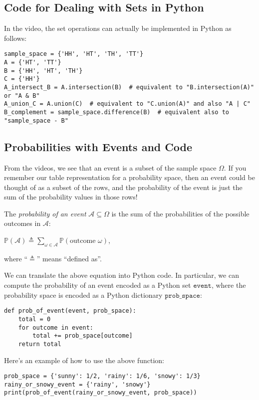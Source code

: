 \documentclass[6008notes.tex]{subfiles}
\begin{document}
\subsection{Code for Dealing with Sets in Python}

In the video, the set operations can actually be implemented in Python as follows:

\begin{lstlisting}
sample_space = {'HH', 'HT', 'TH', 'TT'}
A = {'HT', 'TT'}
B = {'HH', 'HT', 'TH'}
C = {'HH'}
A_intersect_B = A.intersection(B)  # equivalent to "B.intersection(A)" or "A & B"
A_union_C = A.union(C)  # equivalent to "C.union(A)" and also "A | C"
B_complement = sample_space.difference(B)  # equivalent also to "sample_space - B"
\end{lstlisting}

\subsection{Probabilities with Events and Code}

From the videos, we see that an event is a subset of the sample space $\Omega$. If you remember our table representation for a probability space, then an event could be thought of as a subset of the rows, and the probability of the event is just the sum of the probability values in those rows!

The \textit{probability of an event} $\mathcal{A}\subseteq \Omega$ is the sum of the probabilities of the possible outcomes in $\mathcal{A}$:

$\mathbb {P}(\mathcal{A})\triangleq \sum _{\omega \in \mathcal{A}}\mathbb {P}(\text {outcome }\omega )$,
 
where ``$\triangleq$'' means ``defined as''.

We can translate the above equation into Python code. In particular, we can compute the probability of an event encoded as a Python set $\texttt{event}$, where the probability space is encoded as a Python dictionary $\texttt{prob\_space}$:

\begin{lstlisting}
def prob_of_event(event, prob_space):
    total = 0
    for outcome in event:
        total += prob_space[outcome]
    return total
\end{lstlisting}

Here's an example of how to use the above function:

\begin{lstlisting}
prob_space = {'sunny': 1/2, 'rainy': 1/6, 'snowy': 1/3}
rainy_or_snowy_event = {'rainy', 'snowy'}
print(prob_of_event(rainy_or_snowy_event, prob_space))
\end{lstlisting}
\end{document}

